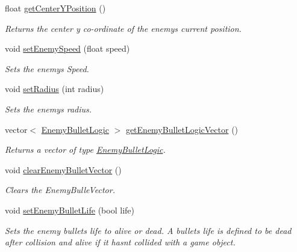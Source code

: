\begin{DoxyCompactItemize}
float \hyperlink{class_enemy_logic_a8eb47a87a47288783e0c8963c39d24e4}{get\+Center\+Y\+Position} ()
\begin{DoxyCompactList}\small\item\em Returns the center y co-\/ordinate of the enemy\textquotesingle{}s current position. \end{DoxyCompactList}\item 
void \hyperlink{class_enemy_logic_aae66ecc1d28feaef7c814a0dff7eed95}{set\+Enemy\+Speed} (float speed)
\begin{DoxyCompactList}\small\item\em Sets the enemy\textquotesingle{}s Speed. \end{DoxyCompactList}\item 
void \hyperlink{class_enemy_logic_acabb2cb226edc71300ba1f2bc3e7a577}{set\+Radius} (int radius)
\begin{DoxyCompactList}\small\item\em Sets the enemy\textquotesingle{}s radius. \end{DoxyCompactList}\item 
vector$<$ \hyperlink{class_enemy_bullet_logic}{Enemy\+Bullet\+Logic} $>$ \hyperlink{class_enemy_logic_ae4e49b9f854bc0407510de8e3824c7c4}{get\+Enemy\+Bullet\+Logic\+Vector} ()
\begin{DoxyCompactList}\small\item\em Returns a vector of type \hyperlink{class_enemy_bullet_logic}{Enemy\+Bullet\+Logic}. \end{DoxyCompactList}\item 
\mbox{\label{class_enemy_logic_af85aebe59b9cdee37bdab690fa496348}} 
void \hyperlink{class_enemy_logic_af85aebe59b9cdee37bdab690fa496348}{clear\+Enemy\+Bullet\+Vector} ()
\begin{DoxyCompactList}\small\item\em Clears the Enemy\+Bulle\+Vector. \end{DoxyCompactList}\item 
void \hyperlink{class_enemy_logic_a88584f95e49bfd6b174b9b1d9a274cc5}{set\+Enemy\+Bullet\+Life} (bool life)
\begin{DoxyCompactList}\small\item\em Sets the enemy bullets life to alive or dead. A bullets life is defined to be dead after collision and alive if it hasnt collided with a game object. \end{DoxyCompactList}\end{DoxyCompactItemize}


